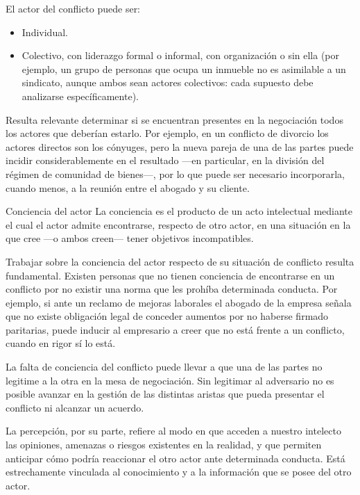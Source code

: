 \documentclass[12pt,oneside]{book}
\begin{document}
El actor del conflicto puede ser:
\begin{itemize}
    \item Individual.
    \item Colectivo, con liderazgo formal o informal, con organización o sin ella (por ejemplo, un grupo de personas que ocupa un inmueble no es asimilable a un sindicato, aunque ambos sean actores colectivos: cada supuesto debe analizarse específicamente).
\end{itemize}

Resulta relevante determinar si se encuentran presentes en la negociación todos los actores que deberían estarlo. Por ejemplo, en un conflicto de divorcio los actores directos son los cónyuges, pero la nueva pareja de una de las partes puede incidir considerablemente en el resultado ---en particular, en la división del régimen de comunidad de bienes---, por lo que puede ser necesario incorporarla, cuando menos, a la reunión entre el abogado y su cliente.

\begin{definition}{Conciencia del actor}
La conciencia es el producto de un acto intelectual mediante el cual el actor admite encontrarse, respecto de otro actor, en una situación en la que cree ---o ambos creen--- tener objetivos incompatibles.
\end{definition}

Trabajar sobre la conciencia del actor respecto de su situación de conflicto resulta fundamental. Existen personas que no tienen conciencia de encontrarse en un conflicto por no existir una norma que les prohíba determinada conducta. Por ejemplo, si ante un reclamo de mejoras laborales el abogado de la empresa señala que no existe obligación legal de conceder aumentos por no haberse firmado paritarias, puede inducir al empresario a creer que no está frente a un conflicto, cuando en rigor sí lo está.

\begin{important}
La falta de conciencia del conflicto puede llevar a que una de las partes no legitime a la otra en la mesa de negociación. Sin legitimar al adversario no es posible avanzar en la gestión de las distintas aristas que pueda presentar el conflicto ni alcanzar un acuerdo.
\end{important}

La percepción, por su parte, refiere al modo en que acceden a nuestro intelecto las opiniones, amenazas o riesgos existentes en la realidad, y que permiten anticipar cómo podría reaccionar el otro actor ante determinada conducta. Está estrechamente vinculada al conocimiento y a la información que se posee del otro actor.
\end{document}
